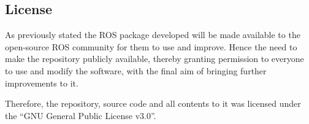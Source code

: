 \subsection{License}

As previously stated the ROS package developed will be made available to the open-source ROS community for them to use and improve. Hence the need to make the repository publicly available, thereby granting permission to everyone to use and modify the software, with the final aim of bringing further improvements to it.

Therefore, the repository, source code and all contents to it was licensed under the “GNU General Public License v3.0”.
